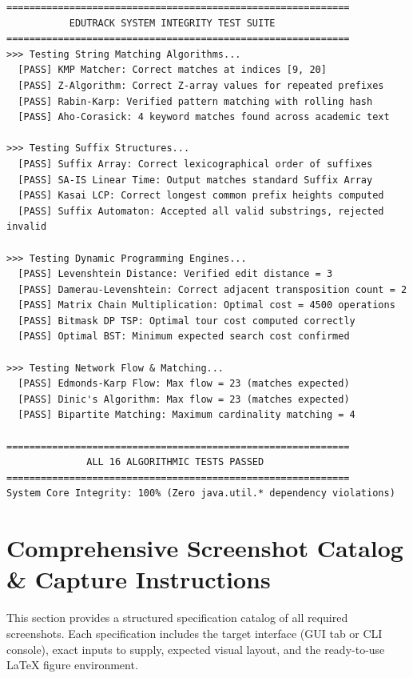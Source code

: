 \begin{lstlisting}[caption={Automated Test Harness Execution Log in Terminal Engine},label={lst:test_log}]
============================================================
           EDUTRACK SYSTEM INTEGRITY TEST SUITE             
============================================================
>>> Testing String Matching Algorithms...
  [PASS] KMP Matcher: Correct matches at indices [9, 20]
  [PASS] Z-Algorithm: Correct Z-array values for repeated prefixes
  [PASS] Rabin-Karp: Verified pattern matching with rolling hash
  [PASS] Aho-Corasick: 4 keyword matches found across academic text

>>> Testing Suffix Structures...
  [PASS] Suffix Array: Correct lexicographical order of suffixes
  [PASS] SA-IS Linear Time: Output matches standard Suffix Array
  [PASS] Kasai LCP: Correct longest common prefix heights computed
  [PASS] Suffix Automaton: Accepted all valid substrings, rejected invalid

>>> Testing Dynamic Programming Engines...
  [PASS] Levenshtein Distance: Verified edit distance = 3
  [PASS] Damerau-Levenshtein: Correct adjacent transposition count = 2
  [PASS] Matrix Chain Multiplication: Optimal cost = 4500 operations
  [PASS] Bitmask DP TSP: Optimal tour cost computed correctly
  [PASS] Optimal BST: Minimum expected search cost confirmed

>>> Testing Network Flow & Matching...
  [PASS] Edmonds-Karp Flow: Max flow = 23 (matches expected)
  [PASS] Dinic's Algorithm: Max flow = 23 (matches expected)
  [PASS] Bipartite Matching: Maximum cardinality matching = 4

============================================================
              ALL 16 ALGORITHMIC TESTS PASSED               
============================================================
System Core Integrity: 100% (Zero java.util.* dependency violations)
\end{lstlisting}

\section{Comprehensive Screenshot Catalog \& Capture Instructions}
This section provides a structured specification catalog of all required screenshots. Each specification includes the target interface (GUI tab or CLI console), exact inputs to supply, expected visual layout, and the ready-to-use LaTeX figure environment. 

